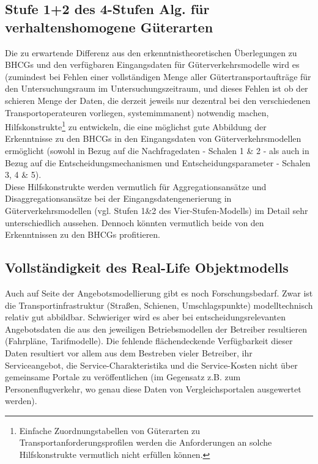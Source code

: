 % 
\subsection{Stufe 1+2 des 4-Stufen Alg. für verhaltenshomogene Güterarten}
\label{_Toc365801614}
\label{_Toc366766124}
\label{_Toc366775318}

\label{_Toc363572055}
\label{_Toc363601752}Die zu erwartende Differenz aus den erkenntnistheoretischen Überlegungen zu BHCGs und den verfügbaren Eingangsdaten für Güterverkehrsmodelle wird es (zumindest bei Fehlen einer vollständigen Menge aller Gütertransportaufträge für den Untersuchungsraum im Untersuchungszeitraum, und dieses Fehlen ist ob der schieren Menge der Daten, die derzeit jeweils nur dezentral bei den verschiedenen Transportoperateuren vorliegen, systemimmanent) notwendig machen, Hilfskonstrukte\footnote{%
 Einfache Zuordnungstabellen von Güterarten zu Transportanforderungsprofilen werden die Anforderungen an solche Hilfskonstrukte vermutlich nicht erfüllen können.
}%
 zu entwickeln, die eine möglichst gute Abbildung der Erkenntnisse zu den BHCGs in den Eingangsdaten von Güterverkehrsmodellen ermöglicht (sowohl in Bezug auf die Nachfragedaten - Schalen 1 \& 2 - als auch in Bezug auf die Entscheidungsmechanismen und Entscheidungsparameter - Schalen 3, 4 \& 5).~\\
Diese Hilfskonstrukte werden vermutlich für Aggregationsansätze und Disaggregationsansätze bei der Eingangsdatengenerierung in Güterverkehrsmodellen (vgl. Stufen 1\&2 des Vier-Stufen-Modells) im Detail sehr unterschiedlich aussehen. Dennoch könnten vermutlich beide von den Erkenntnissen zu den BHCGs profitieren.~\\


% 
\subsection{Vollständigkeit des Real-Life Objektmodells}
\label{_Toc365801615}
\label{_Toc366766125}
\label{_Toc366775319}

\label{_Toc363572056}
\label{_Toc363601753}Auch auf Seite der Angebotsmodellierung gibt es noch Forschungsbedarf. Zwar ist die Transportinfrastruktur (Straßen, Schienen, Umschlagspunkte) modelltechnisch relativ gut abbildbar. Schwieriger wird es aber bei entscheidungsrelevanten Angebotsdaten die aus den jeweiligen Betriebsmodellen der Betreiber resultieren (Fahrpläne, Tarifmodelle). Die fehlende flächendeckende Verfügbarkeit dieser Daten resultiert vor allem aus dem Bestreben vieler Betreiber, ihr Serviceangebot, die Service-Charakteristika und die Service-Kosten nicht über gemeinsame Portale zu veröffentlichen (im Gegensatz z.B. zum Personenflugverkehr, wo genau diese Daten von Vergleichsportalen ausgewertet werden).~\\


